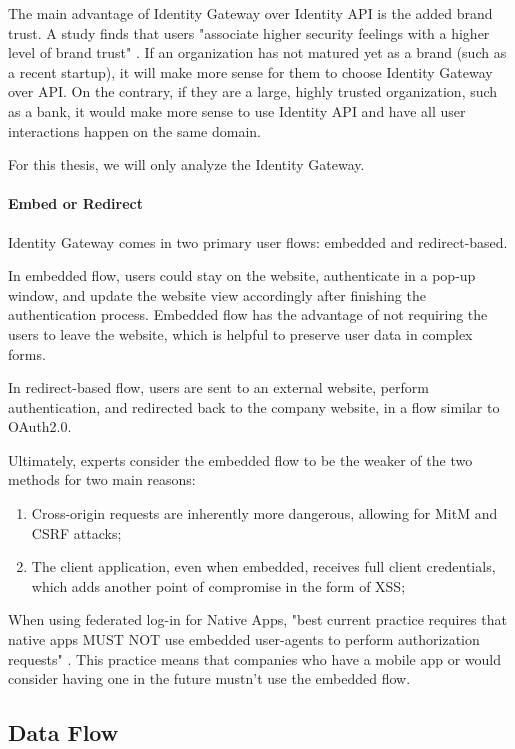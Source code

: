 The main advantage of Identity Gateway over Identity API is the added brand trust. A study finds that users "associate higher security feelings with a higher level of brand trust" \cite{ha2004factors}. If an organization has not matured yet as a brand (such as a recent startup), it will make more sense for them to choose Identity Gateway over API. On the contrary, if they are a large, highly trusted organization, such as a bank, it would make more sense to use Identity API and have all user interactions happen on the same domain.

For this thesis, we will only analyze the Identity Gateway.

\paragraph{Embed or Redirect}

Identity Gateway comes in two primary user flows: embedded and redirect-based.

In embedded flow, users could stay on the website, authenticate in a pop-up window, and update the website view accordingly after finishing the authentication process. Embedded flow has the advantage of not requiring the users to leave the website, which is helpful to preserve user data in complex forms.

In redirect-based flow, users are sent to an external website, perform authentication, and redirected back to the company website, in a flow similar to OAuth2.0.

Ultimately, experts consider the embedded flow to be the weaker of the two methods \cite{auth0-universal-vs-embedded} for two main reasons:

\begin{enumerate}
  \item Cross-origin requests are inherently more dangerous, allowing for MitM and CSRF attacks;
  \item The client application, even when embedded, receives full client credentials, which adds another point of compromise in the form of XSS;
\end{enumerate}

When using federated log-in for Native Apps, "best current practice requires that native apps MUST NOT use embedded user-agents to perform authorization requests" \cite{rfc8252}. This practice means that companies who have a mobile app or would consider having one in the future mustn't use the embedded flow.

\subsection{Data Flow}

